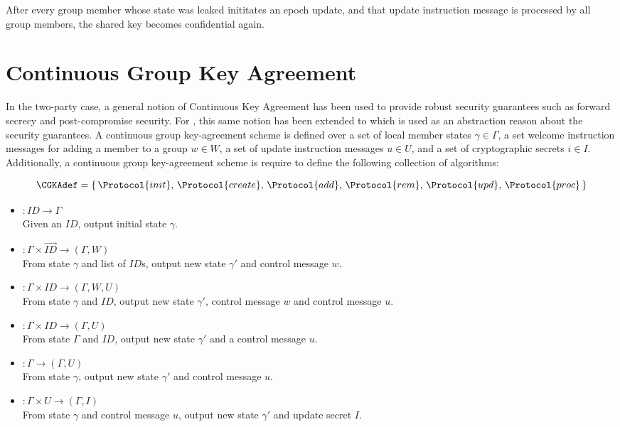 \begin{definition}
After every group member whose state was leaked inititates an epoch update, and that update instruction message is processed by all group members, the shared key becomes confidential again.
\end{definition}


\hypertarget{sec:CGKA}{%
\section{Continuous Group Key Agreement}\label{sec:CGKA}}

In the two-party case, a general notion of Continuous Key Agreement \autocite{alwen2019double} has been used to provide robust security guarantees such as forward secrecy and post-compromise security.
For , this same notion has been extended to  \autocite{alwen2020security} which is used as an abstraction reason about the  security guarantees.
A continuous group key-agreement scheme is defined over a set of local member states $\gamma \in \Gamma$, a set welcome instruction messages for adding a member to a group $w \in W$, a set of update instruction messages $u \in U$, and a set of cryptographic secrets $i \in I$.
Additionally, a continuous group key-agreement scheme is require to define the following collection of algorithms:

\[ \CGKAdef = \left\{\,\Protocol{init},\, \Protocol{create},\, \Protocol{add},\, \Protocol{rem},\, \Protocol{upd},\, \Protocol{proc}\,\right\} \]

\begin{itemize}
\item {}   \(: ID \to \Gamma\)\\
  Given an \(ID\), output initial state \(\gamma\).
\item {} \(: \Gamma \times \overrightarrow{ID} \to (\Gamma, W)\)\\
  From state \(\gamma\) and list of \(ID\)s, output new state \(\gamma'\) and control message \(w\).
\item {}    \(: \Gamma \times ID \to (\Gamma, W, U)\)\\
  From state \(\gamma\) and \(ID\), output new state \(\gamma'\), control message \(w\) and control message \(u\).
\item {}    \(: \Gamma \times ID \to (\Gamma, U)\)\\
  From state \(\Gamma\) and \(ID\), output new state \(\gamma'\) and a control message \(u\).
\item {}    \(: \Gamma \to (\Gamma, U)\)\\
  From state \(\gamma\), output new state \(\gamma'\) and control message \(u\).
\item {}   \(: \Gamma \times U \to (\Gamma, I)\)\\
  From state \(\gamma\) and control message \(u\), output new state \(\gamma'\) and update secret \(I\).
\end{itemize}

